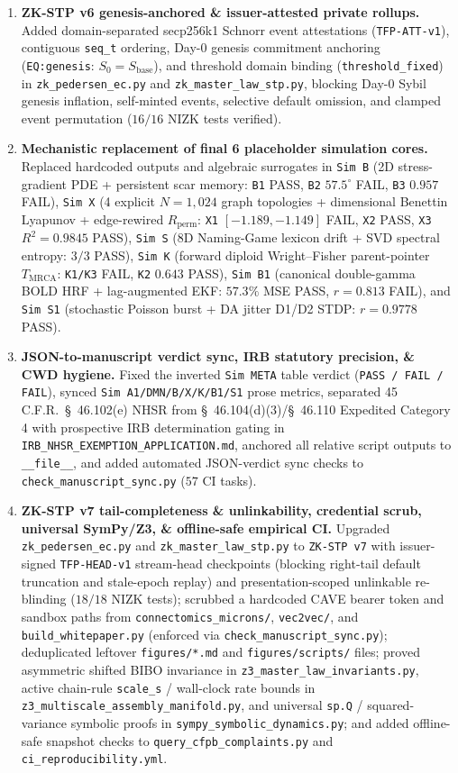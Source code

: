 \documentclass[11pt]{article}
\begin{document}
\begin{enumerate}
\item \textbf{ZK-STP v6 genesis-anchored \& issuer-attested private rollups.} Added domain-separated secp256k1 Schnorr event attestations (\texttt{TFP-ATT-v1}), contiguous \texttt{seq\_t} ordering, Day-0 genesis commitment anchoring (\texttt{EQ:genesis}: $S_0 = S_{\text{base}}$), and threshold domain binding (\texttt{threshold\_fixed}) in \texttt{zk\_pedersen\_ec.py} and \texttt{zk\_master\_law\_stp.py}, blocking Day-0 Sybil genesis inflation, self-minted events, selective default omission, and clamped event permutation ($16/16$ NIZK tests verified).
\item \textbf{Mechanistic replacement of final 6 placeholder simulation cores.} Replaced hardcoded outputs and algebraic surrogates in \texttt{Sim B} (2D stress-gradient PDE + persistent scar memory: \texttt{B1} PASS, \texttt{B2} $57.5^\circ$ FAIL, \texttt{B3} $0.957$ FAIL), \texttt{Sim X} (4 explicit $N=1{,}024$ graph topologies + dimensional Benettin Lyapunov + edge-rewired $R_{\text{perm}}$: \texttt{X1} $[-1.189,-1.149]$ FAIL, \texttt{X2} PASS, \texttt{X3} $R^2=0.9845$ PASS), \texttt{Sim S} (8D Naming-Game lexicon drift + SVD spectral entropy: $3/3$ PASS), \texttt{Sim K} (forward diploid Wright--Fisher parent-pointer $T_{\text{MRCA}}$: \texttt{K1/K3} FAIL, \texttt{K2} $0.643$ PASS), \texttt{Sim B1} (canonical double-gamma BOLD HRF + lag-augmented EKF: $57.3\%$ MSE PASS, $r=0.813$ FAIL), and \texttt{Sim S1} (stochastic Poisson burst + DA jitter D1/D2 STDP: $r=0.9778$ PASS).
\item \textbf{JSON-to-manuscript verdict sync, IRB statutory precision, \& CWD hygiene.} Fixed the inverted \texttt{Sim META} table verdict (\texttt{PASS / FAIL / FAIL}), synced \texttt{Sim A1/DMN/B/X/K/B1/S1} prose metrics, separated 45 C.F.R.\ \S{}~46.102(e) NHSR from \S{}~46.104(d)(3)/\S{}~46.110 Expedited Category 4 with prospective IRB determination gating in \texttt{IRB\_NHSR\_EXEMPTION\_APPLICATION.md}, anchored all relative script outputs to \texttt{\_\_file\_\_}, and added automated JSON-verdict sync checks to \texttt{check\_manuscript\_sync.py} ($57$ CI tasks).
\item \textbf{ZK-STP v7 tail-completeness \& unlinkability, credential scrub, universal SymPy/Z3, \& offline-safe empirical CI.} Upgraded \texttt{zk\_pedersen\_ec.py} and \texttt{zk\_master\_law\_stp.py} to \texttt{ZK-STP v7} with issuer-signed \texttt{TFP-HEAD-v1} stream-head checkpoints (blocking right-tail default truncation and stale-epoch replay) and presentation-scoped unlinkable re-blinding ($18/18$ NIZK tests); scrubbed a hardcoded CAVE bearer token and sandbox paths from \texttt{connectomics\_microns/}, \texttt{vec2vec/}, and \texttt{build\_whitepaper.py} (enforced via \texttt{check\_manuscript\_sync.py}); deduplicated leftover \texttt{figures/*.md} and \texttt{figures/scripts/} files; proved asymmetric shifted BIBO invariance in \texttt{z3\_master\_law\_invariants.py}, active chain-rule \texttt{scale\_s} / wall-clock rate bounds in \texttt{z3\_multiscale\_assembly\_manifold.py}, and universal \texttt{sp.Q} / squared-variance symbolic proofs in \texttt{sympy\_symbolic\_dynamics.py}; and added offline-safe snapshot checks to \texttt{query\_cfpb\_complaints.py} and \texttt{ci\_reproducibility.yml}.

\end{enumerate}
\end{document}
